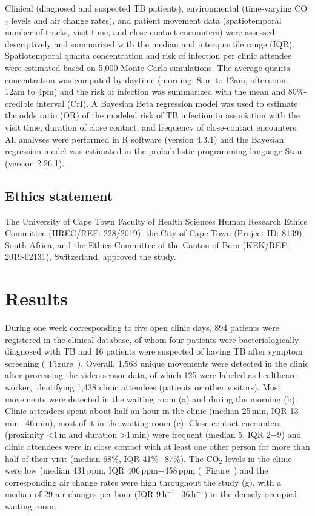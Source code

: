 \documentclass[fleqn,11pt]{wlscirep}
\begin{document}
Clinical (diagnosed and suspected TB patients), environmental (time-varying CO$_2$ levels and air change rates), and patient movement data (spatiotemporal number of tracks, visit time, and close-contact encounters) were assessed descriptively and summarized with the median and interquartile range (IQR). Spatiotemporal quanta concentration and risk of infection per clinic attendee were estimated based on 5,000 Monte Carlo simulations. The average quanta concentration was computed by daytime (morning: 8am to 12am, afternoon: 12am to 4pm) and the risk of infection was summarized with the mean and 80\%-credible interval (CrI). A Bayesian Beta regression model was used to estimate the odds ratio (OR) of the modeled risk of TB infection in association with the visit time, duration of close contact, and frequency of close-contact encounters. All analyses were performed in R software (version 4.3.1) and the Bayesian regression model was estimated in the probabilistic programming language Stan (version 2.26.1).

\subsection{Ethics statement}

The University of Cape Town Faculty of Health Sciences Human Research Ethics Committee (HREC/REF: 228/2019), the City of Cape Town (Project ID: 8139), South Africa, and the Ethics Committee of the Canton of Bern (KEK/REF: 2019-02131), Switzerland, approved the study.

\newpage

\section{Results}

During one week corresponding to five open clinic days, 894 patients were registered in the clinical database, of whom four patients were bacteriologically diagnosed with TB and 16 patients were suspected of having TB after symptom screening (\supp~Figure~). Overall, 1,563 unique movements were detected in the clinic after processing the video sensor data, of which 125 were labeled as healthcare worker, identifying 1,438 clinic attendees (patients or other visitors). Most movements were detected in the waiting room (a) and during the morning (b). Clinic attendees spent about half an hour in the clinic (median 25\,min, IQR 13\,min$-$46\,min), most of it in the waiting room (c). Close-contact encounters (proximity <1\,m and duration >1\,min) were frequent (median 5, IQR 2$-$9) and clinic attendees were in close contact with at least one other person for more than half of their visit (median 68\%, IQR 41\%$-$87\%). The CO$_2$ levels in the clinic were low (median 431\,ppm, IQR 406\,ppm$-$458\,ppm (\supp~Figure~) and the corresponding air change rates were high throughout the study (g), with a \eg median of 29 air changes per hour (IQR 9\,h$^{-1}$$-$36\,h$^{-1}$) in the densely occupied waiting room. 
\end{document}
